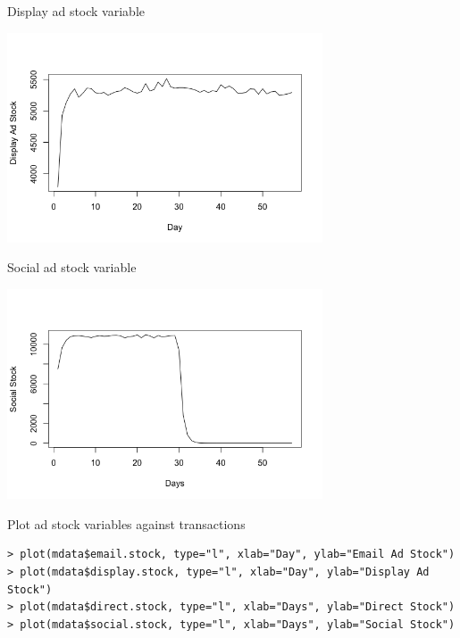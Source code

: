 \documentclass[10pt, aspectratio=169]{beamer}
\begin{document}
\begin{frame}{Display ad stock variable}
\begin{center}
\includegraphics[width=0.7\textwidth]{images/mixmodeldisplaystock.png}
\end{center}
\end{frame}

\begin{frame}{Social ad stock variable}
\begin{center}
\includegraphics[width=0.7\textwidth]{images/mixmodelsocialstock.png}
\end{center}
\end{frame}

\begin{frame}[fragile]{Plot ad stock variables against transactions}
\begin{lstlisting}
> plot(mdata$email.stock, type="l", xlab="Day", ylab="Email Ad Stock")
> plot(mdata$display.stock, type="l", xlab="Day", ylab="Display Ad Stock")
> plot(mdata$direct.stock, type="l", xlab="Days", ylab="Direct Stock")
> plot(mdata$social.stock, type="l", xlab="Days", ylab="Social Stock")
\end{lstlisting}
\end{frame}
\end{document}

